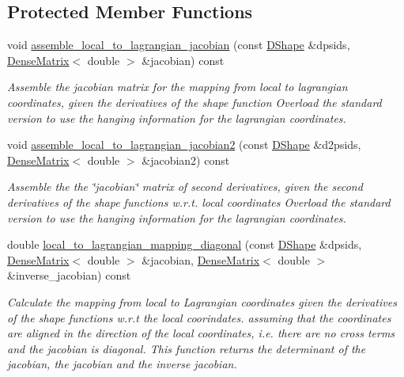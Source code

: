 \subsection*{Protected Member Functions}
\begin{DoxyCompactItemize}
\item 
void \hyperlink{classoomph_1_1RefineableSolidElement_ae0d5a2fc617a11036a80d0d016292d7a}{assemble\+\_\+local\+\_\+to\+\_\+lagrangian\+\_\+jacobian} (const \hyperlink{classoomph_1_1DShape}{D\+Shape} \&dpsids, \hyperlink{classoomph_1_1DenseMatrix}{Dense\+Matrix}$<$ double $>$ \&jacobian) const
\begin{DoxyCompactList}\small\item\em Assemble the jacobian matrix for the mapping from local to lagrangian coordinates, given the derivatives of the shape function Overload the standard version to use the hanging information for the lagrangian coordinates. \end{DoxyCompactList}\item 
void \hyperlink{classoomph_1_1RefineableSolidElement_a5843ecc4836508342150862e11af99f4}{assemble\+\_\+local\+\_\+to\+\_\+lagrangian\+\_\+jacobian2} (const \hyperlink{classoomph_1_1DShape}{D\+Shape} \&d2psids, \hyperlink{classoomph_1_1DenseMatrix}{Dense\+Matrix}$<$ double $>$ \&jacobian2) const
\begin{DoxyCompactList}\small\item\em Assemble the the \char`\"{}jacobian\char`\"{} matrix of second derivatives, given the second derivatives of the shape functions w.\+r.\+t. local coordinates Overload the standard version to use the hanging information for the lagrangian coordinates. \end{DoxyCompactList}\item 
double \hyperlink{classoomph_1_1RefineableSolidElement_a492846d9f2c5d5235f9f3ff1001d4ec8}{local\+\_\+to\+\_\+lagrangian\+\_\+mapping\+\_\+diagonal} (const \hyperlink{classoomph_1_1DShape}{D\+Shape} \&dpsids, \hyperlink{classoomph_1_1DenseMatrix}{Dense\+Matrix}$<$ double $>$ \&jacobian, \hyperlink{classoomph_1_1DenseMatrix}{Dense\+Matrix}$<$ double $>$ \&inverse\+\_\+jacobian) const
\begin{DoxyCompactList}\small\item\em Calculate the mapping from local to Lagrangian coordinates given the derivatives of the shape functions w.\+r.\+t the local coorindates. assuming that the coordinates are aligned in the direction of the local coordinates, i.\+e. there are no cross terms and the jacobian is diagonal. This function returns the determinant of the jacobian, the jacobian and the inverse jacobian. \end{DoxyCompactList}\end{DoxyCompactItemize}
